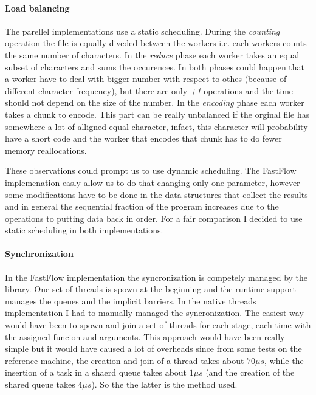 \documentclass[12pt, letterpaper]{article}
\begin{document}
\paragraph*{Load balancing}
The parellel implementations use a static scheduling. During the \textit{counting} operation the file is equally diveded between the workers i.e. each workers counts the same number of characters. In the \textit{reduce} phase each worker takes an equal subset of characters and sums the occurences. In both phases could happen that a worker have to deal with bigger number with respect to othes (because of different character frequency), but there are only \textit{+1} operations and the time should not depend on the size of the number. In the \textit{encoding} phase each worker takes a chunk to encode. This part can be really unbalanced if the orginal file has somewhere a lot of alligned equal character, infact, this character will probability have a short code and the worker that encodes that chunk has to do fewer memory reallocations.

These observations could prompt us to use dynamic scheduling. The FastFlow implemenation easly allow us to do that changing only one parameter, however some modifications have to be done in the data structures that collect the results and in general the sequential fraction of the program increases due to the operations to putting data back in order. For a fair comparison I decided to use static scheduling in both implementations.

\paragraph*{Synchronization}
In the FastFlow implementation the syncronization is competely managed by the library. One set of threads is spown at the beginning and the runtime support manages the queues and the implicit barriers. In the native threads implementation I had to manually managed the syncronization. The easiest way would have been to spown and join a set of threads for each stage, each time with the assigned funcion and arguments. This approach would have been really simple but it would have caused a lot of overheads since from some tests on the reference machine, the creation and join of a thread takes about $70 \mu s$, while the insertion of a task in a shaerd queue takes about $1 \mu s$ (and the creation of the shared queue takes $4 \mu s$). So the the latter is the method used.
\end{document}
